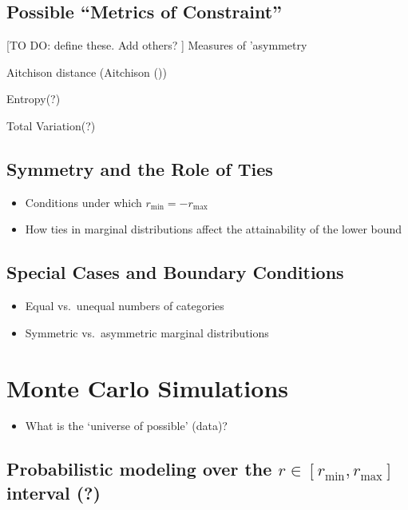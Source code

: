 \documentclass[
  12pt,
]{article}
\providecommand{\tightlist}{%
  \setlength{\itemsep}{0pt}\setlength{\parskip}{0pt}}\usepackage{longtable,booktabs,array}
\theoremstyle{plain}
\theoremstyle{definition}
\theoremstyle{remark}
\begin{document}
\subsection{Possible ``Metrics of
Constraint''}\label{possible-metrics-of-constraint}

{[}TO DO: define these. Add others? {]} Measures of 'asymmetry

Aitchison distance (Aitchison ())

Entropy(?)

Total Variation(?)

\subsection{Symmetry and the Role of
Ties}\label{symmetry-and-the-role-of-ties}

\begin{itemize}
\tightlist
\item
  Conditions under which \(r_{\min} = -r_{\max}\)
\item
  How ties in marginal distributions affect the attainability of the
  lower bound
\end{itemize}

\subsection{Special Cases and Boundary
Conditions}\label{special-cases-and-boundary-conditions}

\begin{itemize}
\tightlist
\item
  Equal vs.~unequal numbers of categories\\
\item
  Symmetric vs.~asymmetric marginal distributions
\end{itemize}

\section{Monte Carlo Simulations}\label{monte-carlo-simulations}

\begin{itemize}
\tightlist
\item
  What is the `universe of possible' (data)?
\end{itemize}

\subsection{\texorpdfstring{Probabilistic modeling over the
\(r \in [r_{\min}, r_{\max}]\) interval
(?)}{Probabilistic modeling over the r \textbackslash in {[}r\_\{\textbackslash min\}, r\_\{\textbackslash max\}{]} interval (?)}}\label{probabilistic-modeling-over-the-r-in-r_min-r_max-interval}
\end{document}
